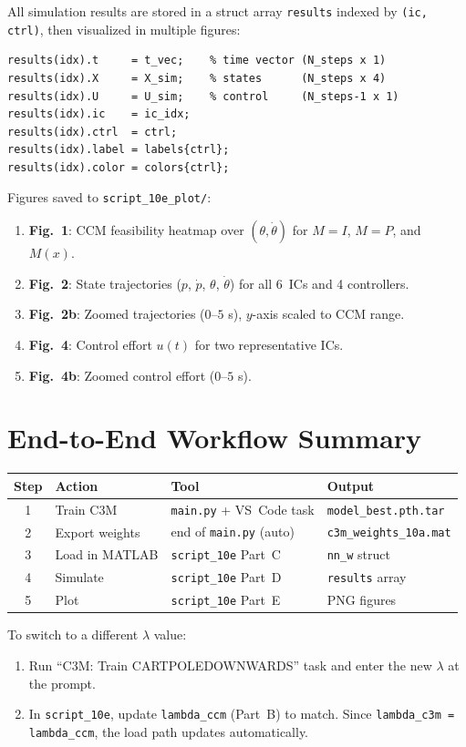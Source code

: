 \documentclass[11pt,a4paper]{article}
\begin{document}
All simulation results are stored in a struct array \texttt{results} indexed by \texttt{(ic, ctrl)}, then visualized in multiple figures:

\begin{lstlisting}
results(idx).t     = t_vec;    % time vector (N_steps x 1)
results(idx).X     = X_sim;    % states      (N_steps x 4)
results(idx).U     = U_sim;    % control     (N_steps-1 x 1)
results(idx).ic    = ic_idx;
results(idx).ctrl  = ctrl;
results(idx).label = labels{ctrl};
results(idx).color = colors{ctrl};
\end{lstlisting}

Figures saved to \texttt{script\_10e\_plot/}:
\begin{enumerate}[leftmargin=2em]
    \item \textbf{Fig.~1}: CCM feasibility heatmap over \((\theta, \dot\theta)\) for \(M=I\), \(M=P\), and \(M(x)\).
    \item \textbf{Fig.~2}: State trajectories (\(p\), \(\dot p\), \(\theta\), \(\dot\theta\)) for all 6~ICs and 4 controllers.
    \item \textbf{Fig.~2b}: Zoomed trajectories (\(0\)--\(5\) s), \(y\)-axis scaled to CCM range.
    \item \textbf{Fig.~4}: Control effort \(u(t)\) for two representative ICs.
    \item \textbf{Fig.~4b}: Zoomed control effort (\(0\)--\(5\) s).
\end{enumerate}

\section{End-to-End Workflow Summary}

\begin{center}
\renewcommand{\arraystretch}{1.3}
\begin{tabular}{clll}
\toprule
\textbf{Step} & \textbf{Action} & \textbf{Tool} & \textbf{Output} \\
\midrule
1 & Train C3M & \texttt{main.py} + VS~Code task & \texttt{model\_best.pth.tar} \\
2 & Export weights & end of \texttt{main.py} (auto) & \texttt{c3m\_weights\_10a.mat} \\
3 & Load in MATLAB & \texttt{script\_10e} Part~C & \texttt{nn\_w} struct \\
4 & Simulate & \texttt{script\_10e} Part~D & \texttt{results} array \\
5 & Plot & \texttt{script\_10e} Part~E & PNG figures \\
\bottomrule
\end{tabular}
\end{center}

To switch to a different \(\lambda\) value:
\begin{enumerate}[leftmargin=2em]
    \item Run ``C3M: Train CARTPOLEDOWNWARDS'' task and enter the new \(\lambda\) at the prompt.
    \item In \texttt{script\_10e}, update \texttt{lambda\_ccm} (Part~B) to match.  Since \texttt{lambda\_c3m = lambda\_ccm}, the load path updates automatically.
\end{enumerate}
\end{document}
